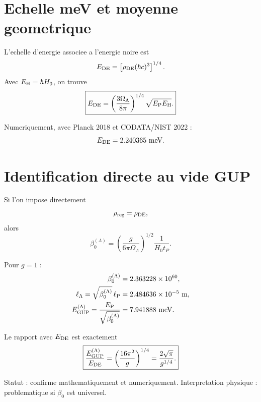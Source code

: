\documentclass[11pt,a4paper]{article}
\newcommand{\lp}{\ell_{\rm P}}
\newcommand{\EP}{E_{\rm P}}
\newcommand{\EH}{E_{\rm H}}
\newcommand{\rhoDE}{\rho_{\rm DE}}
\newcommand{\rhoReg}{\rho_{\rm reg}}
\newcommand{\EGUP}{E_{\rm GUP}}
\begin{document}
\section{Echelle meV et moyenne geometrique}

L'echelle d'energie associee a l'energie noire est
\begin{equation}
E_{\rm DE}
=
\left[\rhoDE(\hbar c)^3\right]^{1/4}.
\end{equation}
Avec $\EH=\hbar H_0$, on trouve
\begin{equation}
\boxed{
E_{\rm DE}
=
\left(\frac{3\Omega_\Lambda}{8\pi}\right)^{1/4}
\sqrt{\EP\EH}.
}
\label{eq:Ede}
\end{equation}

Numeriquement, avec Planck 2018 et CODATA/NIST 2022 :
\begin{equation}
E_{\rm DE}=2.240365~{\rm meV}.
\end{equation}

\section{Identification directe au vide GUP}

Si l'on impose directement
\begin{equation}
\rhoReg=\rhoDE,
\end{equation}
alors
\begin{equation}
\boxed{
\beta_0^{(\Lambda)}
=
\left(\frac{g}{6\pi\Omega_\Lambda}\right)^{1/2}
\frac{1}{H_0t_P}.
}
\label{eq:beta0_lambda}
\end{equation}

Pour $g=1$ :
\begin{align}
\beta_0^{(\Lambda)}
&=
2.363228\times10^{60},\\
\ell_\Lambda
=
\sqrt{\beta_0^{(\Lambda)}}\,\lp
&=
2.484636\times10^{-5}\ {\rm m},\\
\EGUP^{(\Lambda)}
=
\frac{\EP}{\sqrt{\beta_0^{(\Lambda)}}}
&=
7.941888\ {\rm meV}.
\end{align}

Le rapport avec $E_{\rm DE}$ est exactement
\begin{equation}
\boxed{
\frac{\EGUP^{(\Lambda)}}{E_{\rm DE}}
=
\left(\frac{16\pi^2}{g}\right)^{1/4}
=
\frac{2\sqrt{\pi}}{g^{1/4}}.
}
\label{eq:ratio_egup_ede}
\end{equation}

Statut : confirme mathematiquement et numeriquement. Interpretation physique :
problematique si $\beta_0$ est universel.
\end{document}
